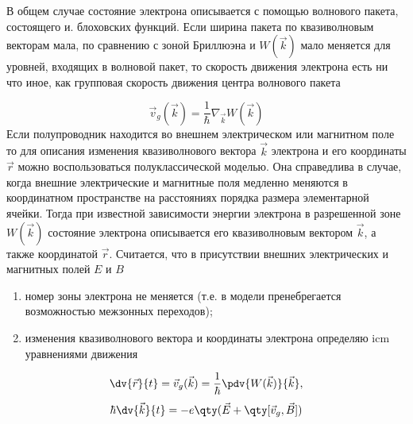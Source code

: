 В общем случае состояние электрона описывается с помощью волнового
пакета, состоящего и. блоховских функций. Если ширина пакета по квазиволновым векторам мала, по сравнению с зоной Бриллюэна и $W(\vec k)$ мало меняется для
уровней, входящих в волновой пакет, то скорость движения электрона есть ни
что иное, как групповая скорость движения центра волнового пакета

\begin{equation}
	\vec v_g(\vec k)=\frac{1}{\hbar} \nabla_{\vec k} W(\vec k)
\end{equation}
	Если полупроводник находится во внешнем электрическом или магнитном поле
то для описания изменения квазиволнового вектора $\vec{k}$ электрона и его координаты $\vec r$ можно воспользоваться полуклассической моделью. Она справедлива в
случае, когда внешние электрические и магнитные поля медленно меняются в
координатном пространстве на расстояниях порядка размера элементарной
ячейки. Тогда при известной зависимости энергии электрона в разрешенной зоне
$W(\vec k)$ состояние электрона описывается его квазиволновым вектором $\vec k$, а также
координатой $\vec r$. Считается, что в присутствии внешних электрических и магнитных полей $E$ и $B$

\begin{enumerate}
	\item номер зоны электрона не меняется (т.е. в модели пренебрегается 
	возможностью межзонных переходов);
	\item изменения квазиволнового вектора и координаты электрона определяю icm
уравнениями движения
\end{enumerate}

\begin{equation}
	\label{eq:1.4a}
	\dv{\vec r}{t}=\vec v_g (\vec k)=\frac{1}{\hbar} \pdv{W(\vec{k})}{\vec{k}},
\end{equation}
\begin{equation}
	\label{eq:1.4b}
	\hbar \dv{\vec{k}}{t}= -e \qty(\vec{E}+ \qty[\vec v_g, \vec B] )
\end{equation}

